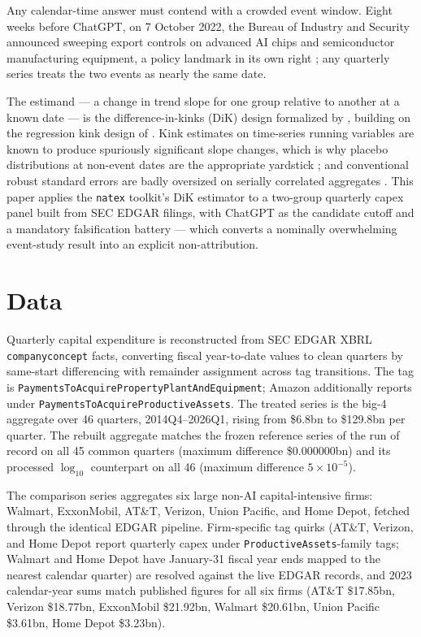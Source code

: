 \documentclass[11pt]{article}
\newcommand{\natex}{\texttt{natex}}
\begin{document}
Any calendar-time answer must contend with a crowded event window. Eight weeks
before ChatGPT, on 7 October 2022, the Bureau of Industry and Security
announced sweeping export controls on advanced AI chips and semiconductor
manufacturing equipment, a policy landmark in its own right \cite{allen2022};
any quarterly series treats the two events as nearly the same date.

The estimand --- a change in trend slope for one group relative to another at a
known date --- is the difference-in-kinks (DiK) design formalized by
\cite{bockerman2025}, building on the regression kink design of
\cite{card2015}. Kink estimates on time-series running variables are known to
produce spuriously significant slope changes, which is why placebo
distributions at non-event dates are the appropriate yardstick
\cite{ganong2018}; and conventional robust standard errors are badly oversized
on serially correlated aggregates \cite{bertrand2004}. This paper applies the
\natex{} toolkit's DiK estimator \cite{natex} to a two-group quarterly capex
panel built from SEC EDGAR filings, with ChatGPT as the candidate cutoff and a
mandatory falsification battery --- which converts a nominally overwhelming
event-study result into an explicit non-attribution.

\section{Data}\label{sec:data}

Quarterly capital expenditure is reconstructed from SEC EDGAR XBRL
\texttt{companyconcept} facts, converting fiscal year-to-date values to clean
quarters by same-start differencing with remainder assignment across tag
transitions. The tag is
\texttt{PaymentsToAcquirePropertyPlantAndEquipment}; Amazon additionally
reports under \texttt{PaymentsToAcquireProductiveAssets}. The treated series is the big-4 aggregate over 46
quarters, 2014Q4--2026Q1, rising from \$6.8bn to \$129.8bn per quarter. The
rebuilt aggregate matches the frozen reference series of the run of record on
all 45 common quarters (maximum difference \$0.000000bn) and its processed
$\log_{10}$ counterpart on all 46 (maximum difference $5\times10^{-5}$).

The comparison series aggregates six large non-AI capital-intensive firms:
Walmart, ExxonMobil, AT\&T, Verizon, Union Pacific, and Home Depot, fetched
through the identical EDGAR pipeline. Firm-specific tag quirks (AT\&T,
Verizon, and Home Depot report quarterly capex under
\texttt{ProductiveAssets}-family tags; Walmart and Home Depot have
January-31 fiscal year ends mapped to the nearest calendar quarter) are
resolved against the live EDGAR records, and 2023 calendar-year sums match
published figures for all six firms (AT\&T \$17.85bn, Verizon \$18.77bn,
ExxonMobil \$21.92bn, Walmart \$20.61bn, Union Pacific \$3.61bn, Home Depot
\$3.23bn).
\end{document}
